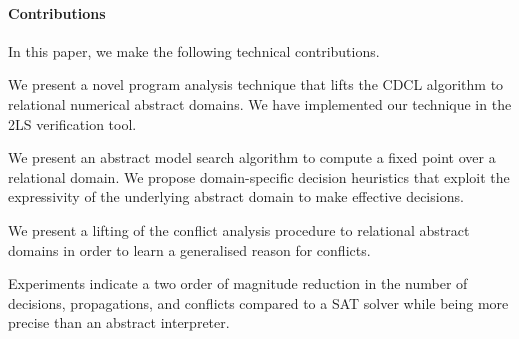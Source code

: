 \paragraph{Contributions}
In this paper, we make the following technical contributions.
%
\begin{compactenum}
\item We present a novel program analysis technique that 
lifts the CDCL algorithm to relational numerical abstract domains.   
We have implemented our technique in the 2LS verification tool.  

\item We present an abstract model search algorithm 
to compute a fixed point over a relational domain.  We propose 
domain-specific decision heuristics that exploit the expressivity 
of the underlying abstract domain to make effective decisions. 

\item We present a lifting of the conflict analysis procedure 
to relational abstract domains in order to learn a generalised reason 
for conflicts.  
 
\item  Experiments indicate a two order of magnitude reduction 
in the number of decisions, propagations, and conflicts compared 
to a SAT solver while being more precise than an abstract interpreter.  
\end{compactenum}
